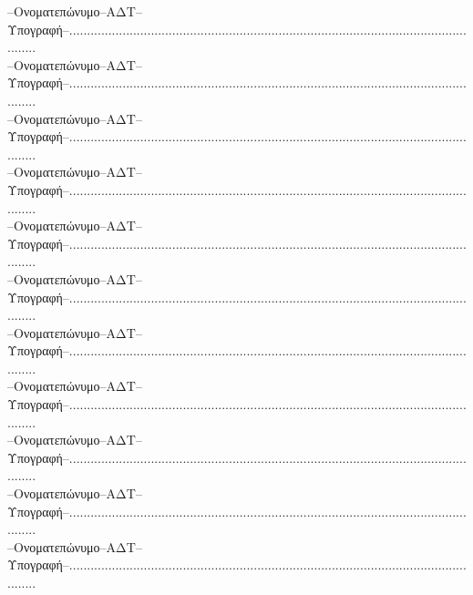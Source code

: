 \documentclass[a4paper]{article}
\begin{document}
{\noindent --Ονοματεπώνυμο--ΑΔΤ--Υπογραφή--........................................................................................................................\\

\noindent --Ονοματεπώνυμο--ΑΔΤ--Υπογραφή--........................................................................................................................\\

\noindent --Ονοματεπώνυμο--ΑΔΤ--Υπογραφή--........................................................................................................................\\

\noindent --Ονοματεπώνυμο--ΑΔΤ--Υπογραφή--........................................................................................................................\\

\noindent --Ονοματεπώνυμο--ΑΔΤ--Υπογραφή--........................................................................................................................\\

\noindent --Ονοματεπώνυμο--ΑΔΤ--Υπογραφή--........................................................................................................................\\

\noindent --Ονοματεπώνυμο--ΑΔΤ--Υπογραφή--........................................................................................................................\\

\noindent --Ονοματεπώνυμο--ΑΔΤ--Υπογραφή--........................................................................................................................\\

\noindent --Ονοματεπώνυμο--ΑΔΤ--Υπογραφή--........................................................................................................................\\

\noindent --Ονοματεπώνυμο--ΑΔΤ--Υπογραφή--........................................................................................................................\\

\noindent --Ονοματεπώνυμο--ΑΔΤ--Υπογραφή--........................................................................................................................\\

}
\end{document}
